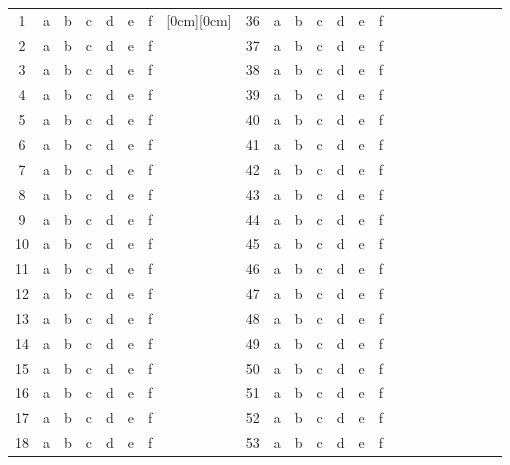 \documentclass[amsfonts,bezier,leqno,fleqn,12pt,a4paper]{article}
\begin{document}
{\begin{Large}
\vspace{10mm}


\end{Large}
\begin{normalsize}
\begin{center}
\begin{tabular}{|c|c c c c c c|c|c|c c c c c c|c|c|c c c c c c|}
\cline{1-7}\cline{9-15}
1  & a & b & c & d & e & f & \raisebox{0ex}[0cm][0cm]{\hspace{1cm}} & 36 & a & b & c & d & e & f\\ \cline{1-7}\cline{9-15}
2 & a & b & c & d & e & f & & 37& a & b & c & d & e & f\\ \cline{1-7}\cline{9-15}
3 & a & b & c & d & e & f & & 38& a & b & c & d & e & f\\ \cline{1-7}\cline{9-15}
4 & a & b & c & d & e & f & & 39& a & b & c & d & e & f\\ \cline{1-7}\cline{9-15}
5 & a & b & c & d & e & f & & 40& a & b & c & d & e & f\\ \cline{1-7}\cline{9-15}
6 & a & b & c & d & e & f & & 41& a & b & c & d & e & f\\ \cline{1-7}\cline{9-15}
7 & a & b & c & d & e & f & & 42& a & b & c & d & e & f\\ \cline{1-7}\cline{9-15}
8 & a & b & c & d & e & f & & 43& a & b & c & d & e & f\\ \cline{1-7}\cline{9-15}
9 & a & b & c & d & e & f & & 44& a & b & c & d & e & f\\ \cline{1-7}\cline{9-15}
10 & a & b & c & d & e & f & & 45& a & b & c & d & e & f\\ \cline{1-7}\cline{9-15}
11 & a & b & c & d & e & f & & 46& a & b & c & d & e & f\\ \cline{1-7}\cline{9-15}
12 & a & b & c & d & e & f & & 47& a & b & c & d & e & f\\ \cline{1-7}\cline{9-15}
13 & a & b & c & d & e & f & & 48& a & b & c & d & e & f\\ \cline{1-7}\cline{9-15}
14 & a & b & c & d & e & f & & 49& a & b & c & d & e & f\\ \cline{1-7}\cline{9-15}
15 & a & b & c & d & e & f & & 50& a & b & c & d & e & f\\ \cline{1-7}\cline{9-15}
16 & a & b & c & d & e & f & & 51& a & b & c & d & e & f\\ \cline{1-7}\cline{9-15}
17 & a & b & c & d & e & f & & 52& a & b & c & d & e & f\\ \cline{1-7}\cline{9-15}
18 & a & b & c & d & e & f & & 53& a & b & c & d & e & f\\ \cline{1-7}\cline{9-15}

\end{tabular}
\end{center}
\end{normalsize}}
\end{document}
